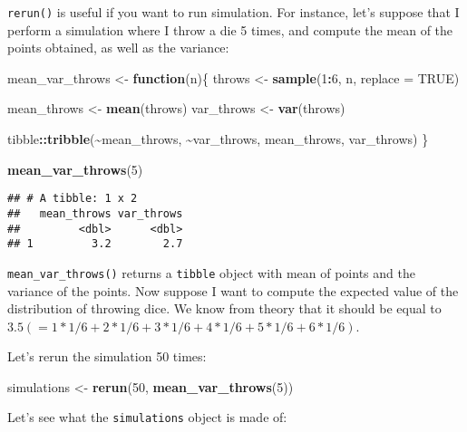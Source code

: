 \documentclass[
]{article}
\newenvironment{Shaded}{\begin{snugshade}}{\end{snugshade}}
\newcommand{\ControlFlowTok}[1]{\textcolor[rgb]{0.13,0.29,0.53}{\textbf{#1}}}
\newcommand{\DataTypeTok}[1]{\textcolor[rgb]{0.13,0.29,0.53}{#1}}
\newcommand{\DecValTok}[1]{\textcolor[rgb]{0.00,0.00,0.81}{#1}}
\newcommand{\KeywordTok}[1]{\textcolor[rgb]{0.13,0.29,0.53}{\textbf{#1}}}
\newcommand{\NormalTok}[1]{#1}
\newcommand{\OperatorTok}[1]{\textcolor[rgb]{0.81,0.36,0.00}{\textbf{#1}}}
\newcommand{\OtherTok}[1]{\textcolor[rgb]{0.56,0.35,0.01}{#1}}
\newcommand{\StringTok}[1]{\textcolor[rgb]{0.31,0.60,0.02}{#1}}
\begin{document}
\texttt{rerun()} is useful if you want to run simulation. For instance, let's suppose that I perform a simulation
where I throw a die 5 times, and compute the mean of the points obtained, as well as the variance:

\begin{Shaded}
\begin{Highlighting}[]
\NormalTok{mean\_var\_throws \textless{}{-}}\StringTok{ }\ControlFlowTok{function}\NormalTok{(n)\{}
\NormalTok{  throws \textless{}{-}}\StringTok{ }\KeywordTok{sample}\NormalTok{(}\DecValTok{1}\OperatorTok{:}\DecValTok{6}\NormalTok{, n, }\DataTypeTok{replace =} \OtherTok{TRUE}\NormalTok{)}

\NormalTok{  mean\_throws \textless{}{-}}\StringTok{ }\KeywordTok{mean}\NormalTok{(throws)}
\NormalTok{  var\_throws \textless{}{-}}\StringTok{ }\KeywordTok{var}\NormalTok{(throws)}

\NormalTok{  tibble}\OperatorTok{::}\KeywordTok{tribble}\NormalTok{(}\OperatorTok{\textasciitilde{}}\NormalTok{mean\_throws, }\OperatorTok{\textasciitilde{}}\NormalTok{var\_throws,}
\NormalTok{                   mean\_throws, var\_throws)}
\NormalTok{\}}

\KeywordTok{mean\_var\_throws}\NormalTok{(}\DecValTok{5}\NormalTok{)}
\end{Highlighting}
\end{Shaded}

\begin{verbatim}
## # A tibble: 1 x 2
##   mean_throws var_throws
##         <dbl>      <dbl>
## 1         3.2        2.7
\end{verbatim}

\texttt{mean\_var\_throws()} returns a \texttt{tibble} object with mean of points and the variance of the points. Now suppose
I want to compute the expected value of the distribution of throwing dice. We know from theory that it should
be equal to \(3.5 (= 1*1/6 + 2*1/6 + 3*1/6 + 4*1/6 + 5*1/6 + 6*1/6)\).

Let's rerun the simulation 50 times:

\begin{Shaded}
\begin{Highlighting}[]
\NormalTok{simulations \textless{}{-}}\StringTok{ }\KeywordTok{rerun}\NormalTok{(}\DecValTok{50}\NormalTok{, }\KeywordTok{mean\_var\_throws}\NormalTok{(}\DecValTok{5}\NormalTok{))}
\end{Highlighting}
\end{Shaded}

Let's see what the \texttt{simulations} object is made of:
\end{document}
